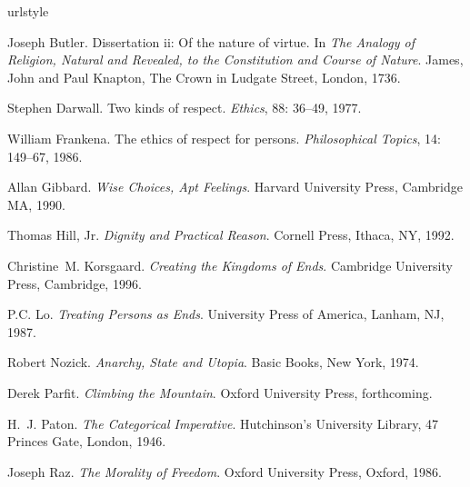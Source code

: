 \documentclass[a4paper,12pt]{article}
\begin{document}

\begin{thebibliography}{24}
\providecommand{\natexlab}[1]{#1}
\providecommand{\url}[1]{\texttt{#1}}
\expandafter\ifx\csname urlstyle\endcsname\relax
  \providecommand{\doi}[1]{doi: #1}\else
  \providecommand{\doi}{doi: \begingroup \urlstyle{rm}\Url}\fi

Joseph Butler.
\newblock Dissertation ii: Of the nature of virtue.
\newblock In \emph{The Analogy of Religion, Natural and Revealed, to the
  Constitution and Course of Nature}. James, John and Paul Knapton, The Crown
  in Ludgate Street, London, 1736.

Stephen Darwall.
\newblock Two kinds of respect.
\newblock \emph{Ethics}, 88: 36--49, 1977.

William Frankena.
\newblock The ethics of respect for persons.
\newblock \emph{Philosophical Topics}, 14: 149--67, 1986.

Allan Gibbard.
\newblock \emph{Wise Choices, Apt Feelings}.
\newblock Harvard University Press, Cambridge MA, 1990.

Thomas Hill, Jr.
\newblock \emph{Dignity and Practical Reason}.
\newblock Cornell Press, Ithaca, NY, 1992.

Christine~M. Korsgaard.
\newblock \emph{Creating the Kingdoms of Ends}.
\newblock Cambridge University Press, Cambridge, 1996.

P.C. Lo.
\newblock \emph{Treating Persons as Ends}.
\newblock University Press of America, Lanham, NJ, 1987.

Robert Nozick.
\newblock \emph{Anarchy, State and Utopia}.
\newblock Basic Books, New York, 1974.

Derek Parfit.
\newblock \emph{Climbing the Mountain}.
\newblock Oxford University Press, forthcoming.

H.~J. Paton.
\newblock \emph{The Categorical Imperative}.
\newblock Hutchinson's University Library, 47 Princes Gate, London, 1946.

Joseph Raz.
\newblock \emph{The Morality of Freedom}.
\newblock Oxford University Press, Oxford, 1986.


\end{thebibliography}
\end{document}
